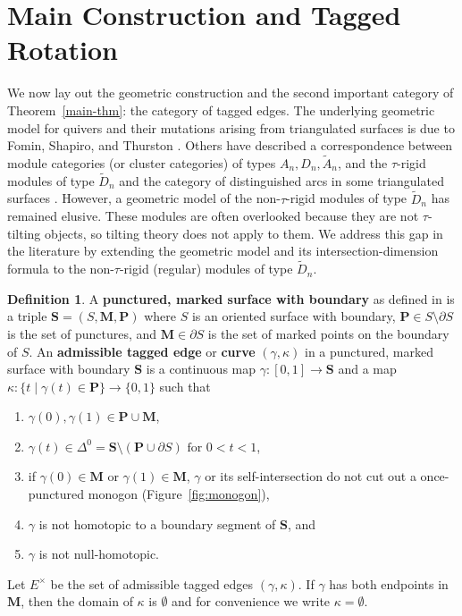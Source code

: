 \documentclass[11pt]{amsart}
\theoremstyle{plain}
\theoremstyle{definition}
\newtheorem{definition}[theorem]{Definition}
\numberwithin{equation}{section}
\def\surf{\mathbf{S}}                       %
\def\PP{\mathbf{P}}
\def\MM{\mathbf{M}}
\begin{document}
\section{Main Construction and Tagged Rotation}

We now lay out the geometric construction and the second important category of Theorem~\ref{main-thm}: the category of tagged edges. 
The underlying geometric model for quivers and their mutations arising from triangulated surfaces is due to Fomin, Shapiro, and Thurston \cite{fomin_cluster_2008}.
Others have described a correspondence between module categories (or cluster categories) of types $A_n, D_n, \widetilde{A}_n$, and the $\tau$-rigid modules of type $\widetilde{D}_n$ and the category of distinguished arcs in some triangulated surfaces \cite{baur_geometric_2015,caldero_quivers_2006,he_mutation_2022, he_geometric_2023, schiffler_geometric_2008}.
However, a geometric model of the non-$\tau$-rigid modules of type $\widetilde{D}_n$ has remained elusive. 
These modules are often overlooked because they are not $\tau$-tilting objects, so tilting theory does not apply to them. 
We address this gap in the literature by extending the geometric model and its intersection-dimension formula to the non-$\tau$-rigid (regular) modules of type $\widetilde{D}_n$.

\begin{definition}\label{def-tagged}
    A \textbf{punctured, marked surface with boundary} as defined in \cite{fomin_cluster_2008} is a triple $\surf = (S, \MM, \PP)$ where $S$ is an oriented surface with boundary, $\PP \in S \setminus \partial S$ is the set of punctures, and $\MM \in \partial S$ is the set of marked points on the boundary of $S$.
    An \textbf{admissible tagged edge} or \textbf{curve} $(\gamma, \kappa)$ in a punctured, marked surface with boundary $\surf$ is a continuous map $\gamma: [0,1] \to \surf$ and a map $\kappa: \{ t \mid \gamma(t) \in \PP \} \to \{0,1\}$ such that 
    \begin{enumerate}
        \item $\gamma(0), \gamma(1) \in \PP \cup \MM$,
        \item $\gamma(t) \in \Delta^0 = \surf \setminus (\PP \cup \partial S) \text{ for } 0 < t < 1$,
        \item if $\gamma(0) \in \MM$ or $\gamma(1) \in \MM$, $\gamma$ or its self-intersection do not cut out a once-punctured monogon (Figure~\ref{fig:monogon}),
        \item $\gamma$ is not homotopic to a boundary segment of $\surf$, and
        \item $\gamma$ is not null-homotopic.
    \end{enumerate}
    Let $E^\times$ be the set of admissible tagged edges $(\gamma, \kappa)$. 
    If $\gamma$ has both endpoints in $\MM$, then the domain of $\kappa$ is $\emptyset$ and for convenience we write $\kappa = \emptyset$.
\end{definition}
\end{document}
